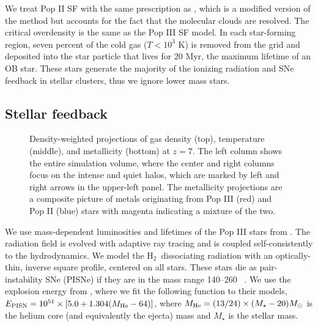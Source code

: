 \documentclass[12pt,preprint]{aastex}
\newcommand{\Ms}{\ifmmode{M_\odot}\else{$M_\odot$}\fi}
\newcommand{\hh}{H$_2$}
\begin{document}
%

We treat Pop II SF with the same prescription as \citet{Wise09}, which
is a modified version of the \citet{Cen92} method but accounts for the
fact that the molecular clouds are resolved.  The critical overdensity
is the same as the Pop III SF model.  In each star-forming region,
seven percent of the cold gas ($T < 10^3$ K) is removed from the grid
and deposited into the star particle that lives for 20 Myr, the
maximum lifetime of an OB star.  These stars generate the majority of
the ionizing radiation and SNe feedback in stellar clusters, thus we
ignore lower mass stars.

\subsection{Stellar feedback}

\begin{figure*}
\caption{\label{fig:projections} Density-weighted projections of gas
  density (top), temperature (middle), and metallicity (bottom) at
  $z=7$.  The left column shows the entire simulation volume, where
  the center and right columns focus on the intense and quiet halos,
  which are marked by left and right arrows in the upper-left panel.
  The metallicity projections are a composite picture of metals
  originating from Pop III (red) and Pop II (blue) stars with magenta
  indicating a mixture of the two.}
\end{figure*}

We use mass-dependent luminosities and lifetimes of the Pop III stars
from \citet{Schaerer02}.  The radiation field is evolved with adaptive
ray tracing \citep{Abel02_RT, Wise10} and is coupled self-consistently
to the hydrodynamics.  We model the \hh~dissociating radiation with an
optically-thin, inverse square profile, centered on all stars.  These
stars die as pair-instability SNe (PISNe) if they are in the mass
range 140--260 \Ms~\citep{Heger03}.  We use the explosion energy from
\citet{Heger02}, where we fit the following function to their models,
$E_{\rm PISN} = 10^{51} \times [5.0 + 1.304 (M_{\rm He} - 64)]$, where
$M_{\rm He} = (13/24) \times (M_\star - 20) \Ms$ is the helium core
(and equivalently the ejecta) mass and $M_\star$ is the stellar mass.
\end{document}
